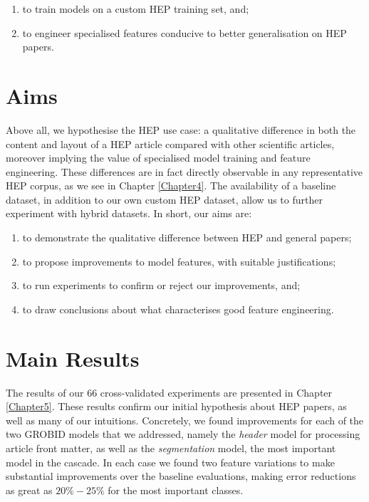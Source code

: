 \begin{enumerate}
\item to train models on a custom HEP training set, and;
\item to engineer specialised features conducive to better generalisation on HEP papers.
\end{enumerate}

\section{Aims}

Above all, we hypothesise the HEP use case: a qualitative difference in both the content and layout of a HEP article compared with other scientific articles, moreover implying the value of specialised model training and feature engineering. These differences are in fact directly observable in any representative HEP corpus, as we see in Chapter \ref{Chapter4}. The availability of a baseline dataset, in addition to our own custom HEP dataset, allow us to further experiment with hybrid datasets. In short, our aims are:

\begin{enumerate}
\item to demonstrate the qualitative difference between HEP and general papers;
\item to propose improvements to model features, with suitable justifications;
\item to run experiments to confirm or reject our improvements, and;
\item to draw conclusions about what characterises good feature engineering.
\end{enumerate}

\section{Main Results}

The results of our 66 cross-validated experiments are presented in Chapter \ref{Chapter5}. These results confirm our initial hypothesis about HEP papers, as well as many of our intuitions. Concretely, we found improvements for each of the two GROBID models that we addressed, namely the \emph{header} model for processing article front matter, as well as the \emph{segmentation} model, the most important model in the cascade. In each case we found two feature variations to make substantial improvements over the baseline evaluations, making error reductions as great as $20\%-25\%$ for the most important classes.

